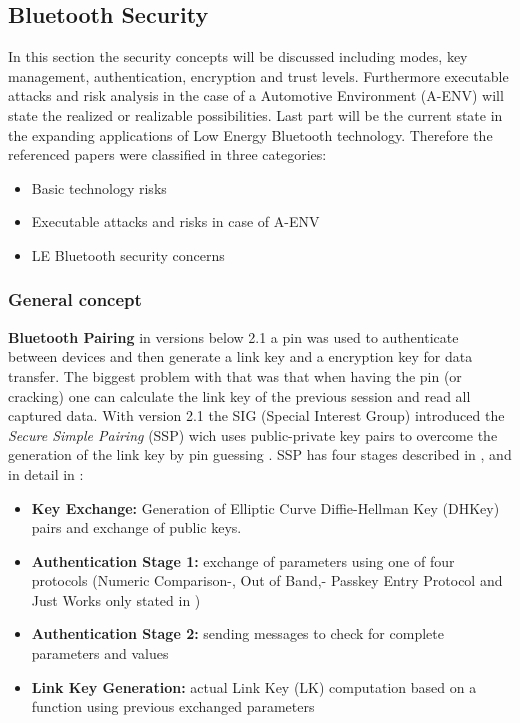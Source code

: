 \documentclass[12pt,a4paper]{article}
\begin{document}
\subsection{Bluetooth Security}
In this section the security concepts will be discussed including modes, key management, authentication, encryption and trust levels. Furthermore executable attacks and risk analysis in the case of a Automotive Environment (A-ENV) will state the realized or realizable possibilities. Last part will be the current state in the expanding applications of Low Energy Bluetooth technology. Therefore the referenced papers were classified in three categories: 
\begin{itemize}
	\item Basic technology risks
	\item Executable attacks and risks in case of A-ENV
	\item LE Bluetooth security concerns
\end{itemize}


\subsubsection{General concept}

\textbf{Bluetooth Pairing} in versions below 2.1 a pin was used to authenticate between devices and then generate a link key and a encryption key for data transfer. The biggest problem with that was that when having the pin (or cracking) one can calculate the link key of the previous session and read all captured data. With version 2.1 the SIG (Special Interest Group) introduced the \emph{Secure Simple Pairing} (SSP) wich uses public-private key pairs to overcome the generation of the link key by pin guessing \cite{DBLP:conf/apnoms/FanSL11}. SSP has four stages described in \cite{DBLP:conf/apnoms/FanSL11},  \cite{DBLP:journals/ijnsec/YehPWH12} and in detail in \cite{DBLP:journals/ijnsec/Lackner13} :

\begin{itemize}
	\item \textbf{Key Exchange:} Generation of Elliptic Curve Diffie-Hellman Key (DHKey) pairs and exchange of public keys.
	\item \textbf{Authentication Stage 1:} exchange of parameters using one of four protocols (Numeric Comparison-, Out of Band,- Passkey Entry Protocol and Just Works only stated in  \cite{DBLP:journals/ijnsec/Lackner13})
	\item  \textbf{Authentication Stage 2:} sending messages to check for complete parameters and values
	\item  \textbf{Link Key Generation:} actual Link Key (LK) computation based on a function using previous exchanged parameters
\end{itemize}
\end{document}

